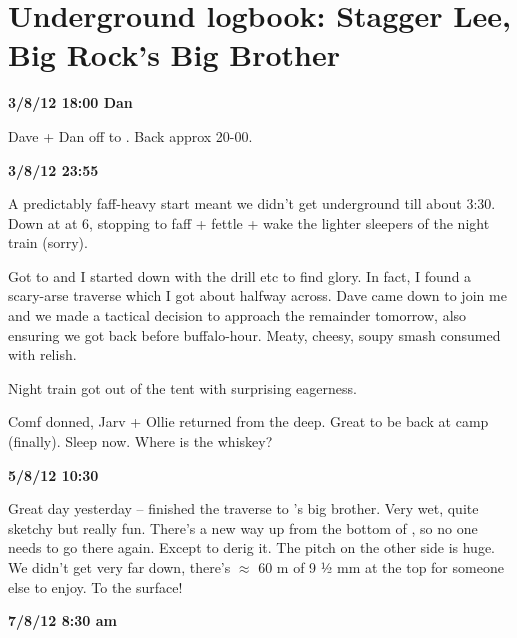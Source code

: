 \section{Underground logbook: Stagger Lee, Big Rock's Big Brother}


\textbf{3/8/12 18:00 Dan}

Dave + Dan off to . Back approx 20-00.

\textbf{3/8/12 23:55}

A predictably faff-heavy start meant we didn't get underground till
about 3:30. Down at  at 6, stopping to faff + fettle + wake the lighter sleepers of the night train (sorry).

Got to  and I started down with the drill etc to find glory. In fact, I found a scary-arse traverse which I got about halfway across. Dave came down to join me and we made a tactical decision to approach the remainder tomorrow, also ensuring we got back before buffalo-hour. Meaty, cheesy, soupy smash consumed with relish.

Night train got out of the tent with surprising eagerness.

Comf donned, Jarv + Ollie returned from the deep. Great to be back at camp (finally). Sleep now. Where is the whiskey?


\textbf{5/8/12 10:30}

Great day yesterday -- finished the traverse to 's big brother. Very wet, quite sketchy but really fun. There's a new way up from the bottom of , so no one needs to go there again. Except to derig it. The pitch on the other side is huge. We didn't get very far down, there's $\approx$ 60 m of 9 ½ mm at the top for someone else to enjoy. To the surface!


\textbf{7/8/12 8:30 am}


